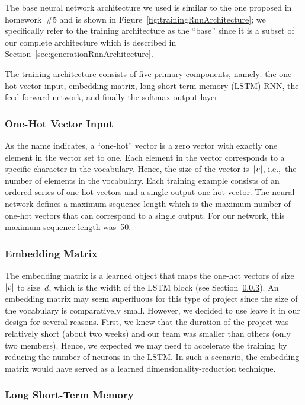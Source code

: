\documentclass{article}
\DeclarePairedDelimiter\abs{\lvert}{\rvert}%
\begin{document}
The base neural network architecture we used is similar to the one proposed in homework~\#5 and is shown in Figure~\ref{fig:trainingRnnArchitecture}; we specifically refer to the training architecture as the ``base'' since it is a subset of our complete architecture which is described in Section~\ref{sec:generationRnnArchitecture}.  

The training architecture consists of five primary components, namely: the one-hot vector input, embedding matrix, long-short term memory (LSTM) RNN, the feed-forward network, and finally the softmax-output layer.

\subsubsection{One-Hot Vector Input}

As the name indicates, a ``one-hot'' vector is a zero vector with exactly one element in the vector set to one.  Each element in the vector corresponds to a specific character in the vocabulary.  Hence, the size of the vector is~$\abs*{v}$, i.e.,~the number of elements in the vocabulary. Each training example consists of an ordered series of one-hot vectors and a single output one-hot vector.  The neural network defines a maximum sequence length which is the maximum number of one-hot vectors that can correspond to a single output.  For our network, this maximum sequence length was~50.

\subsubsection{Embedding Matrix}

The embedding matrix is a learned object that maps the one-hot vectors of size~$\abs*{v}$ to size~$d$, which is the width of the LSTM block (see Section~\ref{sec:lstm}).  An embedding matrix may seem superfluous for this type of project since the size of the vocabulary is comparatively small.  However, we decided to use leave it in our design for several reasons.  First, we knew that the duration of the project was relatively short (about two weeks) and our team was smaller than others (only two members).  Hence, we expected we may need to accelerate the training by reducing the number of neurons in the LSTM.  In such a scenario, the embedding matrix would have served as a learned dimensionality-reduction technique.


\subsubsection{Long Short-Term Memory}\label{sec:lstm}
\end{document}
